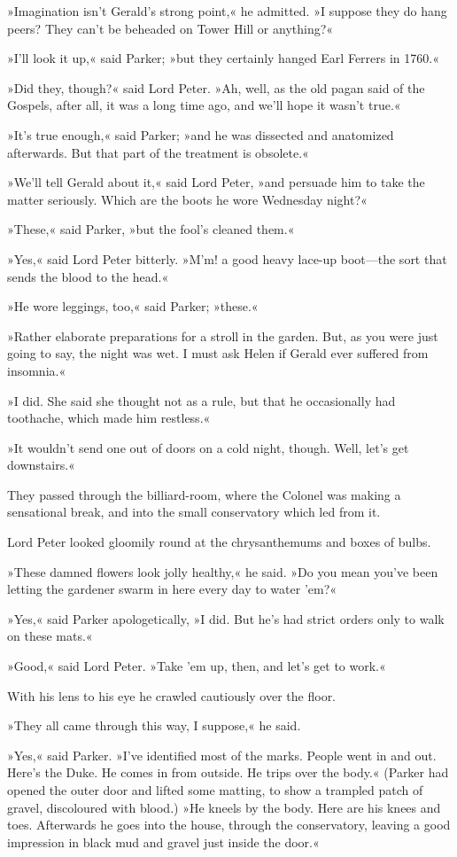»Imagination isn't Gerald's strong point,« he admitted. »I suppose they do hang peers? They can't be beheaded on Tower Hill or anything?«

»I'll look it up,« said Parker; »but they certainly hanged Earl Ferrers in 1760.«

»Did they, though?« said Lord Peter. »Ah, well, as the old pagan said of the Gospels, after all, it was a long time ago, and we'll hope it wasn't true.«

»It's true enough,« said Parker; »and he was dissected and anatomized afterwards. But that part of the treatment is obsolete.«

»We'll tell Gerald about it,« said Lord Peter, »and persuade him to take the matter seriously. Which are the boots he wore Wednesday night?«

»These,« said Parker, »but the fool's cleaned them.«

»Yes,« said Lord Peter bitterly. »M'm! a good heavy lace-up boot—the sort that sends the blood to the head.«

»He wore leggings, too,« said Parker; »these.«

»Rather elaborate preparations for a stroll in the garden. But, as you were just going to say, the night was wet. I must ask Helen if Gerald ever suffered from insomnia.«

»I did. She said she thought not as a rule, but that he occasionally had toothache, which made him restless.«

»It wouldn't send one out of doors on a cold night, though. Well, let's get downstairs.«

They passed through the billiard-room, where the Colonel was making a sensational break, and into the small conservatory which led from it.

Lord Peter looked gloomily round at the chrysanthemums and boxes of bulbs.

»These damned flowers look jolly healthy,« he said. »Do you mean you've been letting the gardener swarm in here every day to water 'em?«

»Yes,« said Parker apologetically, »I did. But he's had strict orders only to walk on these mats.«

»Good,« said Lord Peter. »Take 'em up, then, and let's get to work.«

With his lens to his eye he crawled cautiously over the floor.

»They all came through this way, I suppose,« he said.

»Yes,« said Parker. »I've identified most of the marks. People went in and out. Here's the Duke. He comes in from outside. He trips over the body.« (Parker had opened the outer door and lifted some matting, to show a trampled patch of gravel, discoloured with blood.) »He kneels by the body. Here are his knees and toes. Afterwards he goes into the house, through the conservatory, leaving a good impression in black mud and gravel just inside the door.«

